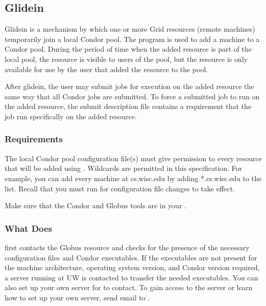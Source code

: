 \subsection{\label{sec:Glidein}Glidein}

Glidein is a mechanism by which one or more Grid resources (remote machines)
temporarily join a local Condor pool. 
The program  is used to add a machine
to a Condor pool.
During the period of time when the added resource is
part of the local pool, the resource is visible 
to users of the pool, but the resource is only available for
use by the user
that added the resource to the pool.

After glidein, the user may submit jobs for execution on the
added resource the same way that all Condor jobs are submitted.
To force a submitted job to run on the added resource, the
submit description file contains a requirement that the job run 
specifically on the added resource.


\subsubsection{ Requirements}

The local Condor pool configuration file(s) must 
give  permission
to every resource that will be added using . 
Wildcards are permitted in this specification.
For example, you can add every machine at
cs.wisc.edu by adding *.cs.wisc.edu to the
 list.
Recall that you must run  for configuration
file changes to take effect.

Make sure that the Condor and Globus tools are in your .

\subsubsection{What  Does}

 first contacts the Globus resource and checks for the
presence of the necessary configuration files and Condor executables.
If the executables are not present for the machine architecture,
operating system version, and Condor version required, a
server running at UW is contacted to transfer the needed executables.
You can also set up your own server for  to contact.
To gain access to the server or learn how to set up your own server,
send email to .

